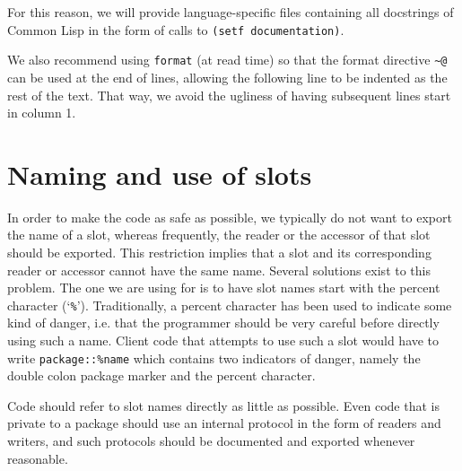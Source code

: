 
For this reason, we will provide language-specific files containing
all docstrings of Common Lisp in the form of calls to \texttt{(setf
documentation)}. 

We also recommend using \texttt{format} (at read time) so that the
format directive \texttt{\~{}@} can be used at the end of lines,
allowing the following line to be indented as the rest of the text.
That way, we avoid the ugliness of having subsequent lines start in
column 1.

\section{Naming and use of slots}

In order to make the code as safe as possible, we typically do not
want to export the name of a slot, whereas frequently, the reader or
the accessor of that slot should be exported.  This restriction
implies that a slot and its corresponding reader or accessor cannot
have the same name.  Several solutions exist to this problem.  The one
we are using for \sysname{} is to have slot names start with the
percent character (`\texttt{\%}').  Traditionally, a percent character
has been used to indicate some kind of danger, i.e. that the
programmer should be very careful before directly using such a name.
Client code that attempts to use such a slot would have to write
\texttt{package::\%name} which contains two indicators of danger,
namely the double colon package marker and the percent character.

Code should refer to slot names directly as little as possible.  Even
code that is private to a package should use an internal protocol in
the form of readers and writers, and such protocols should be
documented and exported whenever reasonable. 

